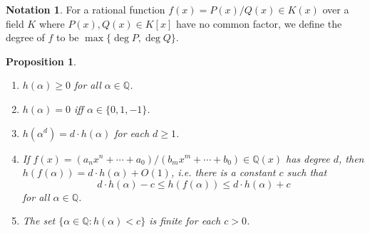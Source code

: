 \documentclass[a4paper]{article}
\theoremstyle{plain}
\newtheorem{proposition}[theorem]{Proposition}
\theoremstyle{remark}
\theoremstyle{definition}
\newtheorem*{notation}{Notation}
\newcommand{\Q}{\mathbb{Q}}
\begin{document}
\begin{notation}
    For a rational function $f(x)=P(x)/Q(x)\in K(x)$ over a field $K$ where
    $P(x),Q(x)\in K[x]$ have no common factor, we define the degree of $f$ to be
    $\max\{\deg P,\deg Q\}$.
\end{notation}

\begin{proposition}
    ~
    \begin{enumerate}[label=(\roman*)]
        \item $h(\alpha)\ge0$ for all $\alpha\in\Q$.

        \item $h(\alpha)=0$ iff $\alpha\in\{0,1,-1\}$.

        \item $h(\alpha^d)=d\cdot h(\alpha)$ for each $d\ge1$.

        \item If $f(x)=(a_nx^n+\cdots+a_0)/(b_mx^m+\cdots+b_0)\in\Q(x)$ has
            degree $d$, then $h(f(\alpha))=d\cdot h(\alpha)+O(1)$, i.e. there is
            a constant $c$ such that
            \begin{equation*}
                d\cdot h(\alpha) - c \le h(f(\alpha)) \le d\cdot h(\alpha) + c
            \end{equation*}
            for all $\alpha\in\Q$.

        \item The set $\{\alpha\in\Q:h(\alpha)<c\}$ is finite for each $c>0$.
    \end{enumerate}
\end{proposition}
\end{document}
